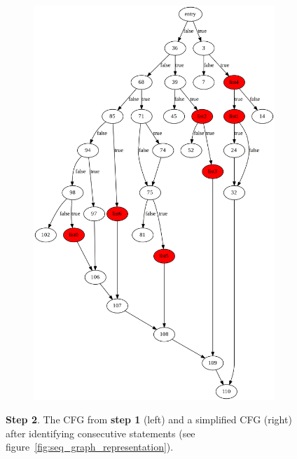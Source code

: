 \begin{figure}[htbp]
	\qquad
	\begin{subfigure}[ht]{0.45\textwidth}
		\includegraphics[width=\textwidth]{inc/appendices/control_flow_analysis_example/step2_after.png}
	\end{subfigure}
	\caption{\textbf{Step 2}. The CFG from \textbf{step 1} (left) and a simplified CFG (right) after identifying consecutive statements (see figure~\ref{fig:seq_graph_representation}).}
	\label{fig:step_2}
\end{figure}

